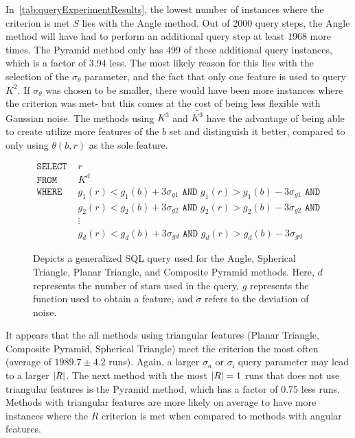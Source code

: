 In~\autoref{tab:queryExperimentResults}, the lowest number of instances where the criterion is met $S$ lies with the
Angle method.
Out of 2000 query steps, the Angle method will have had to perform an additional query step at least 1968 more times.
The Pyramid method only has 499 of these additional query instances, which is a factor of 3.94 less.
The most likely reason for this lies with the selection of the $\sigma_\theta$ parameter, and the fact that only one
feature is used to query $K^2$.
If $\sigma_\theta$ was chosen to be smaller, there would have been more instances where the criterion was met- but
this comes at the cost of being less flexible with Gaussian noise.
The methods using $K^3$ and $\bar{K^3}$ have the advantage of being able to create utilize more features of the $b$ set and
distinguish it better, compared to only using $\theta(b, r)$ as the sole feature.

\begin{figure}
    \begin{align*}
        \texttt{SELECT } &r \\
        \texttt{FROM } &K^d \\
        \texttt{WHERE } &g_1(r) < g_1(b) + 3\sigma_{g1} \texttt{ AND } g_1(r) > g_1(b) - 3\sigma_{g1} \texttt{ AND } \\
        &g_2(r) < g_2(b) + 3\sigma_{g2} \texttt{ AND } g_2(r) > g_2(b) - 3\sigma_{g2} \texttt{ AND } \\
        &\vdots \\
        &g_d(r) < g_d(b) + 3\sigma_{gd} \texttt{ AND } g_d(r) > g_d(b) - 3\sigma_{gd}
    \end{align*}
     \caption{
     Depicts a generalized SQL query used for the Angle, Spherical Triangle, Planar Triangle, and Composite Pyramid
     methods.
     Here, $d$ represents the number of stars used in the query, $g$ represents the function used to obtain a feature,
     and $\sigma$ refers to the deviation of noise.
     }\label{fig:sqlQuery}
\end{figure}

It appears that the all methods using triangular features (Planar Triangle, Composite Pyramid, Spherical Triangle)
meet the criterion the most often (average of $1989.7 \pm 4.2$ runs).
Again, a larger $\sigma_a$ or $\sigma_\imath$ query parameter may lead to a larger $\left| R \right|$.
The next method with the most $\left| R \right| = 1$ runs that does not use triangular features is the Pyramid method,
which has a factor of 0.75 less runs.
Methods with triangular features are more likely on average to have more instances where the $R$ criterion is met
when compared to methods with angular features.

